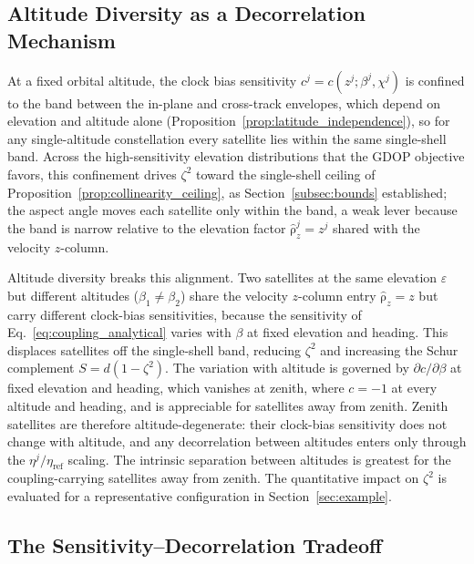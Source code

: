 \documentclass[letterpaper,times]{IONconf-v2}
\theoremstyle{plain}
\theoremstyle{remark}
\renewcommand{\vec}[1]{{\boldsymbol{\mathrm{#1}}}}
\begin{document}
\vspace{-10pt}

\subsection{Altitude Diversity as a Decorrelation Mechanism}\label{subsec:decorrelation_mech}

At a fixed orbital altitude, the clock bias sensitivity $c^j = c(z^j;\beta^j,\chi^j)$ is confined to the band between the in-plane and cross-track envelopes, which depend on elevation and altitude alone (Proposition~\ref{prop:latitude_independence}), so for any single-altitude constellation every satellite lies within the same single-shell band. Across the high-sensitivity elevation distributions that the GDOP objective favors, this confinement drives $\zeta^2$ toward the single-shell ceiling of Proposition~\ref{prop:collinearity_ceiling}, as Section~\ref{subsec:bounds} established; the aspect angle moves each satellite only within the band, a weak lever because the band is narrow relative to the elevation factor $\hat{\vec\rho}_z^j = z^j$ shared with the velocity $z$-column.

Altitude diversity breaks this alignment. Two satellites at the same elevation $\varepsilon$ but different altitudes ($\beta_1 \neq \beta_2$) share the velocity $z$-column entry $\hat{\vec\rho}_z = z$ but carry different clock-bias sensitivities, because the sensitivity of Eq.~\eqref{eq:coupling_analytical} varies with $\beta$ at fixed elevation and heading. This displaces satellites off the single-shell band, reducing $\zeta^2$ and increasing the Schur complement $S = d(1-\zeta^2)$. The variation with altitude is governed by $\partial c/\partial\beta$ at fixed elevation and heading, which vanishes at zenith, where $c = -1$ at every altitude and heading, and is appreciable for satellites away from zenith. Zenith satellites are therefore altitude-degenerate: their clock-bias sensitivity does not change with altitude, and any decorrelation between altitudes enters only through the $\eta^j/\eta_{\mathrm{ref}}$ scaling. The intrinsic separation between altitudes is greatest for the coupling-carrying satellites away from zenith. The quantitative impact on $\zeta^2$ is evaluated for a representative configuration in Section~\ref{sec:example}.

\vspace{-10pt}

\subsection{The Sensitivity--Decorrelation Tradeoff}\label{subsec:sd_tradeoff}
\end{document}
